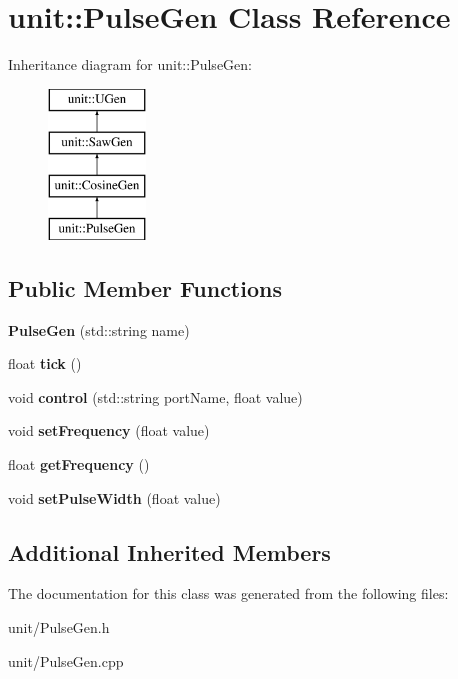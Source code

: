 \hypertarget{classunit_1_1PulseGen}{}\section{unit\+:\+:Pulse\+Gen Class Reference}
\label{classunit_1_1PulseGen}
Inheritance diagram for unit\+:\+:Pulse\+Gen\+:\begin{figure}[H]
\begin{center}
\leavevmode
\includegraphics[height=4.000000cm]{classunit_1_1PulseGen}
\end{center}
\end{figure}
\subsection*{Public Member Functions}
\begin{DoxyCompactItemize}
\item 
{\bfseries Pulse\+Gen} (std\+::string name)\hypertarget{classunit_1_1PulseGen_a466bdb3fcc244e66f2c29a9a517d4b85}{}\label{classunit_1_1PulseGen_a466bdb3fcc244e66f2c29a9a517d4b85}

\item 
float {\bfseries tick} ()\hypertarget{classunit_1_1PulseGen_a8b09b8d3cf11eb6a315bdd9b6347227d}{}\label{classunit_1_1PulseGen_a8b09b8d3cf11eb6a315bdd9b6347227d}

\item 
void {\bfseries control} (std\+::string port\+Name, float value)\hypertarget{classunit_1_1PulseGen_a581c649900c094728f4b587fb36c4f56}{}\label{classunit_1_1PulseGen_a581c649900c094728f4b587fb36c4f56}

\item 
void {\bfseries set\+Frequency} (float value)\hypertarget{classunit_1_1PulseGen_af4a027e50251040d914cdf18a87d7a73}{}\label{classunit_1_1PulseGen_af4a027e50251040d914cdf18a87d7a73}

\item 
float {\bfseries get\+Frequency} ()\hypertarget{classunit_1_1PulseGen_aa4b24157a5f5a95d1ccf0cf639598b8f}{}\label{classunit_1_1PulseGen_aa4b24157a5f5a95d1ccf0cf639598b8f}

\item 
void {\bfseries set\+Pulse\+Width} (float value)\hypertarget{classunit_1_1PulseGen_a9be5874432ee5e966542bc1b568faa61}{}\label{classunit_1_1PulseGen_a9be5874432ee5e966542bc1b568faa61}

\end{DoxyCompactItemize}
\subsection*{Additional Inherited Members}


The documentation for this class was generated from the following files\+:\begin{DoxyCompactItemize}
\item 
unit/Pulse\+Gen.\+h\item 
unit/Pulse\+Gen.\+cpp\end{DoxyCompactItemize}
